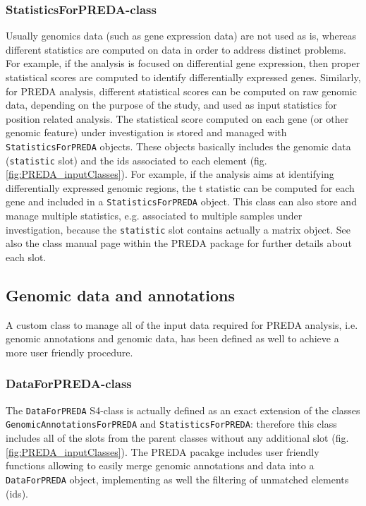 \documentclass[a4paper,10pt]{article}
\begin{document}
\subsubsection{StatisticsForPREDA-class}
Usually genomics data (such as gene expression data) are not used as is, whereas different statistics are computed on data in order to address distinct problems. For example, if the analysis is focused on differential gene expression, then proper statistical scores are computed to identify differentially expressed genes. Similarly, for PREDA analysis, different statistical scores can be computed on raw genomic data, depending on the purpose of the study, and used as input statistics for position related analysis. The statistical score computed on each gene (or other genomic feature) under investigation is stored and managed with \texttt{StatisticsForPREDA} objects. These objects basically includes the genomic data (\texttt{statistic} slot) and the ids associated to each element (fig. \ref{fig:PREDA_inputClasses}). For example, if the analysis aims at identifying differentially expressed genomic regions, the t statistic can be computed for each gene and included in a \texttt{StatisticsForPREDA} object. This class can also store and manage multiple statistics, e.g. associated to multiple samples under investigation, because the \texttt{statistic} slot contains actually a matrix object. See also the class manual page within the PREDA package for further details about each slot.


\subsection{Genomic data and annotations}
A custom class to manage all of the input data required for PREDA analysis, i.e. genomic annotations and genomic data, has been defined as well to achieve a more user friendly procedure.

\subsubsection{DataForPREDA-class}
The \texttt{DataForPREDA} S4-class is actually defined as an exact extension of the classes \texttt{GenomicAnnotationsForPREDA} and \texttt{StatisticsForPREDA}: therefore this class includes all of the slots from the parent classes without any additional slot (fig. \ref{fig:PREDA_inputClasses}). The PREDA pacakge includes user friendly functions allowing to easily merge genomic annotations and data into a \texttt{DataForPREDA} object, implementing as well the filtering of unmatched elements (ids).
\end{document}
